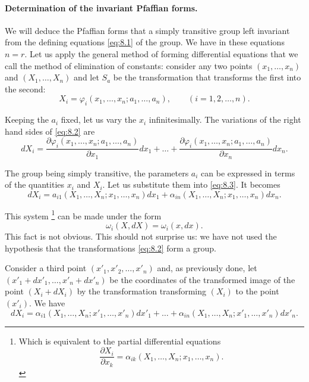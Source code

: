 \documentclass[leqno,11pt]{book}
\makeatletter
\numberwithin{equation}{chapter}
\newcommand{\pd}{\partial}
\theoremstyle{shape1}
\theoremstyle{shapesmall}
\let\old@phi\phi
\let\old@varphi\varphi
\let\phi\old@varphi
\let\varphi\old@phi
\makeatother
\begin{document}
\paragraph{Determination of the invariant Pfaffian forms.}
\label{sec:107}
We will deduce the Pfaffian forms that a simply transitive group left invariant from the defining equations \eqref{eq:8.1} of the group. We have in these equations $n=r$. Let us apply the general method of forming differential equations that we call the method of elimination of constants: consider any two points $(x_{1},\dots,x_{n})$ and $(X_{1},\dots,X_{n})$ and let $S_{a}$ be the transformation that transforms the first into the second:
\begin{equation}
  \label{eq:8.2}
  X_{i}=\phi_{i}(x_{1},\dots,x_{n};a_{1},\dots,a_{n}),\qquad(i=1,2,\dots,n).
\end{equation}

Keeping the $a_{i}$ fixed, let us vary the $x_{i}$ infinitesimally. The variations of the right hand sides of \eqref{eq:8.2} are
\begin{equation}
  \label{eq:8.3}
  dX_{i}=\frac{\pd\phi_{i}(x_{1},\dots,x_{n};a_{1},\dots,a_{n})}{\pd x_{1}}dx_{1}+\dots+\frac{\pd \phi_{i}(x_{1},\dots,x_{n};a_{1},\dots,a_{n})}{\pd x_{n}}dx_{n}.
\end{equation}

The group being simply transitive, the parameters $a_{i}$ can be expressed in terms of the quantities $x_{i}$ and $X_{i}$. Let us substitute them into \eqref{eq:8.3}. It becomes
\begin{equation}
  \label{eq:8.4}
  dX_{i}=a_{i1}(X_{1},\dots,X_{n};x_{1},\dots,x_{n})dx_{1}+\alpha_{in}(X_{1},\dots,X_{n};x_{1},\dots,x_{n})dx_{n}.
\end{equation}

This system \footnote{Which is equivalent to the partial differential equations
\[
\frac{\pd X_{i}}{\pd x_{k}}=\alpha_{ik}(X_{1},\dots,X_{n};x_{1},\dots,x_{n}).
\]}
can be made under the form
\[
\omega_{i}(X,dX)=\omega_{i}(x,dx).
\]
This fact is not obvious. This should not surprise us: we have not used the hypothesis that the transformations \eqref{eq:8.2} form a group.

Consider a third point $(x'_{1},x'_{2},\dots,x'_{n})$ and, as previously done, let $(x'_{1}+dx'_{1},\dots,x'_{n}+dx'_{n})$ be the coordinates of the transformed image of the point $(X_{i}+dX_{i})$ by the transformation transforming $(X_{i})$ to the point $(x'_{i})$. We have
\begin{equation}
  \label{eq:8.5}
  dX_{i}=\alpha_{i1}(X_{1},\dots,X_{n};x'_{1},\dots,x'_{n})dx'_{1}+\dots+\alpha_{in}(X_{1},\dots,X_{n};x'_{1},\dots,x'_{n})dx'_{n}.
\end{equation}
\end{document}
